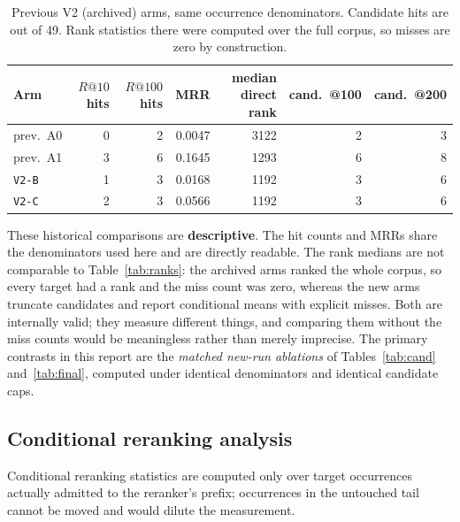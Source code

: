 \documentclass[11pt,a4paper]{article}
\begin{document}
\begin{table}[htbp]
\centering
\small
\caption{Previous V2 (archived) arms, same occurrence denominators. Candidate hits are out of 49. Rank
statistics there were computed over the full corpus, so misses are zero by construction.}
\label{tab:prev}
\begin{tabular}{lrrrrrr}
\toprule
Arm & $R@10$ hits & $R@100$ hits & MRR & median direct rank & cand.\ @100 & cand.\ @200 \\
\midrule
prev.\ A0  & 0 & 2 & 0.0047 & 3122 & 2 & 3 \\
prev.\ A1  & 3 & 6 & 0.1645 & 1293 & 6 & 8 \\
\texttt{V2-B} & 1 & 3 & 0.0168 & 1192 & 3 & 6 \\
\texttt{V2-C} & 2 & 3 & 0.0566 & 1192 & 3 & 6 \\
\bottomrule
\end{tabular}
\end{table}

These historical comparisons are \textbf{descriptive}. The hit counts and MRRs share the denominators used
here and are directly readable. The rank medians are not comparable to Table~\ref{tab:ranks}: the archived
arms ranked the whole corpus, so every target had a rank and the miss count was zero, whereas the new arms
truncate candidates and report conditional means with explicit misses. Both are internally valid; they
measure different things, and comparing them without the miss counts would be meaningless rather than
merely imprecise. The primary contrasts in this report are the \emph{matched new-run ablations} of
Tables~\ref{tab:cand} and~\ref{tab:final}, computed under identical denominators and identical candidate
caps.

\subsection{Conditional reranking analysis}
\label{sec:cond}

Conditional reranking statistics are computed only over target occurrences actually admitted to the
reranker's prefix; occurrences in the untouched tail cannot be moved and would dilute the measurement.
\end{document}
